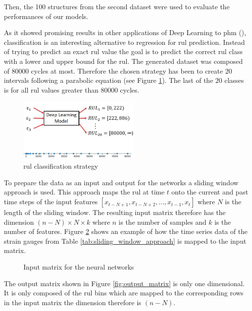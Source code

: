 \documentclass[conference]{IEEEtran}
\begin{document}
Then, the 100 structures from the second dataset were used to evaluate the performances of our models.


As it showed promising results in other applications of Deep Learning to \gls{phm} (\cite{Liu2019a, Xiao2016}), classification is an interesting alternative to regression for \gls{rul} prediction. Instead of trying to predict an exact \gls{rul} value the goal is to predict the correct \gls{rul} class with a lower and upper bound for the \gls{rul}. The generated dataset was composed of $ 80 000 $ cycles at most. Therefore the chosen strategy has been to create $ 20 $ intervals following a parabolic equation (see Figure \ref{fig:RUL_classification}). The last of the $ 20 $ classes is for all \gls{rul} values greater than $ 80 000 $ cycles.

\begin{figure}[htp]
	\centering
	\includegraphics[width=6cm]{RUL_Classification.png}
	\caption{\gls{rul} classification strategy}
	\label{fig:RUL_classification}
\end{figure}

To prepare the data as an input and output for the networks a sliding window approach is used. This approach maps the \gls{rul} at time $ t $ onto the current and past time steps of the input features $ [x_{t-N+1}, x_{t-N+2},..., x_{t-1}, x_t] $ where $ N $ is the length of the sliding window. The resulting input matrix therefore has the dimension $ (n-N) \times N \times k $ where $ n $ is the number of samples and $ k $ is the number of features. Figure \ref{fig:input_matrix} shows an example of how the time series data of the strain gauges from Table \ref{tab:sliding_window_approach} is mapped to the input matrix.

\begin{figure}[htp]
	\centering
	
	\caption{Input matrix for the neural networks}
	\label{fig:input_matrix}
\end{figure}

The output matrix shown in Figure \ref{fig:output_matrix} is only one dimensional. It is only composed of the \gls{rul} bins which are mapped to the corresponding rows in the input matrix the dimension therefore is $ (n-N) $.
\end{document}
